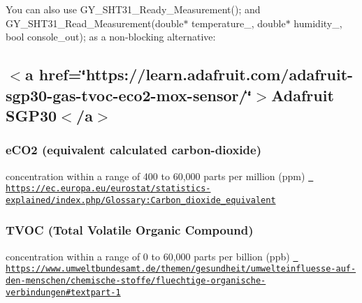 You can also use {\ttfamily G\+Y\+\_\+\+S\+H\+T31\+\_\+\+Ready\+\_\+\+Measurement();} and {\ttfamily G\+Y\+\_\+\+S\+H\+T31\+\_\+\+Read\+\_\+\+Measurement(double$\ast$ temperature\+\_\+, double$\ast$ humidity\+\_\+, bool console\+\_\+out);} as a non-\/blocking alternative\+: 
\begin{DoxyCode}{0}
\DoxyCodeLine{}
\end{DoxyCode}
\hypertarget{autotoc_md17_autotoc_md30}{}\subsection{$<$a href=\char`\"{}https\+://learn.\+adafruit.\+com/adafruit-\/sgp30-\/gas-\/tvoc-\/eco2-\/mox-\/sensor/\char`\"{}$>$\+Adafruit S\+G\+P30$<$/a$>$}\label{autotoc_md17_autotoc_md30}
\hypertarget{autotoc_md17_autotoc_md31}{}\subsubsection{e\+C\+O2 (equivalent calculated carbon-\/dioxide)}\label{autotoc_md17_autotoc_md31}
concentration within a range of 400 to 60,000 parts per million (ppm) \href{https://ec.europa.eu/eurostat/statistics-explained/index.php/Glossary:Carbon_dioxide_equivalent}{\texttt{ https\+://ec.\+europa.\+eu/eurostat/statistics-\/explained/index.\+php/\+Glossary\+:\+Carbon\+\_\+dioxide\+\_\+equivalent}}\hypertarget{autotoc_md17_autotoc_md32}{}\subsubsection{T\+V\+O\+C (\+Total Volatile Organic Compound)}\label{autotoc_md17_autotoc_md32}
concentration within a range of 0 to 60,000 parts per billion (ppb) \href{https://www.umweltbundesamt.de/themen/gesundheit/umwelteinfluesse-auf-den-menschen/chemische-stoffe/fluechtige-organische-verbindungen\#textpart-1}{\texttt{ https\+://www.\+umweltbundesamt.\+de/themen/gesundheit/umwelteinfluesse-\/auf-\/den-\/menschen/chemische-\/stoffe/fluechtige-\/organische-\/verbindungen\#textpart-\/1}} 